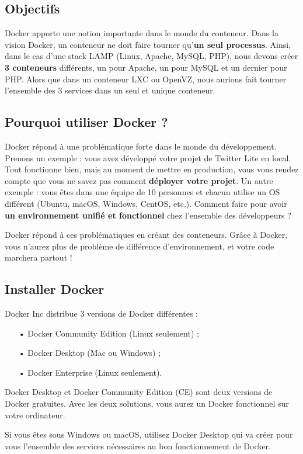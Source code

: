 \documentclass[12pt,a4paper]{article}
\begin{document}
\subsection{Objectifs}
Docker apporte une notion importante dans le monde du conteneur. Dans la vision Docker, un conteneur ne doit faire tourner qu'\textbf{un seul processus}. Ainsi, dans le cas d'une stack LAMP (Linux, Apache, MySQL, PHP), nous devons créer \textbf{3 conteneurs} différents, un pour Apache, un pour MySQL et un dernier pour PHP. Alors que dans un conteneur LXC ou OpenVZ, nous aurions fait tourner l'ensemble des 3 services dans un seul et unique conteneur.

\subsection{Pourquoi utiliser Docker ?}
Docker répond à une problématique forte dans le monde du développement.
Prenons un exemple : vous avez développé votre projet de Twitter Lite en local. Tout fonctionne bien, mais au moment de mettre en production, vous vous rendez compte que vous ne savez pas comment \textbf{déployer votre projet}. Un autre exemple : vous êtes dans une équipe de 10 personnes et chacun utilise un OS différent (Ubuntu, macOS, Windows, CentOS, etc.). Comment faire pour avoir \textbf{un environnement unifié et fonctionnel} chez l'ensemble des développeurs ?

Docker répond à ces problématiques en créant des conteneurs. Grâce à Docker, vous n'aurez plus de problème de différence d'environnement, et votre code marchera partout !

\subsection{Installer Docker}
Docker Inc distribue 3 versions de Docker différentes :
\begin{itemize}
\item[•] Docker Community Edition (Linux seulement) ;
\item[•] Docker Desktop (Mac ou Windows) ;
\item[•] Docker Enterprise (Linux seulement).
\end{itemize}
Docker Desktop et Docker Community Edition (CE) sont deux versions de Docker gratuites. Avec les deux solutions, vous aurez un Docker fonctionnel sur votre ordinateur.

Si vous êtes sous Windows ou macOS, utilisez Docker Desktop qui va créer pour vous l'ensemble des services nécessaires au bon fonctionnement de Docker.
\end{document}
